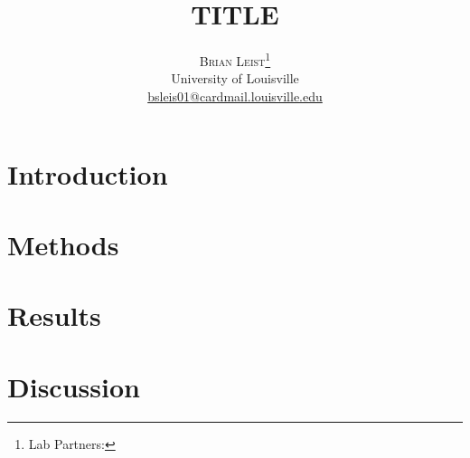 \documentclass[twoside]{article}
\title{\vspace{-15mm}\fontsize{24pt}{10pt}\selectfont\textbf{TITLE}} %
\author{
\large
\textsc{Brian Leist}\thanks{Lab Partners: }\\[2mm] %
\normalsize University of Louisville \\ %
\normalsize \href{mailto:bsleis01@cardmail.louisville.edu}{bsleis01@cardmail.louisville.edu} %
\vspace{-5mm}
}
\date{} %
\begin{document}
\maketitle %
\thispagestyle{fancy} %

\begin{abstract}
\noindent 


\end{abstract}
\begin{multicols}{2} %
\section{Introduction}


\section{Methods}


\section{Results}


\section{Discussion}




\end{multicols}
\end{document}
